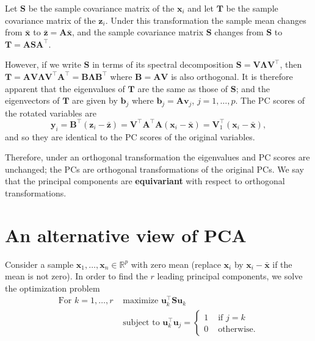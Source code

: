 \documentclass[]{book}
\theoremstyle{definition}
\theoremstyle{definition}
\theoremstyle{definition}
\theoremstyle{remark}
\begin{document}
Let \(\boldsymbol S\) be the sample covariance matrix of the \(\boldsymbol x_i\) and let \(\boldsymbol T\) be the sample covariance matrix of the \(\boldsymbol z_i\). Under this transformation the sample mean changes from \(\bar{\boldsymbol x}\) to \(\bar{\boldsymbol z} = \boldsymbol A\bar{\boldsymbol x}\), and the sample covariance matrix \(\boldsymbol S\) changes from \(\boldsymbol S\) to \(\boldsymbol T= \boldsymbol A\boldsymbol S\boldsymbol A^\top\).

However, if we write \(\boldsymbol S\) in terms of its spectral decomposition \(\boldsymbol S= \boldsymbol V\boldsymbol \Lambda\boldsymbol V^\top\), then \(\boldsymbol T= \boldsymbol A\boldsymbol V\boldsymbol \Lambda\boldsymbol V^\top \boldsymbol A^\top = \boldsymbol B\boldsymbol \Lambda\boldsymbol B^\top\) where \(\boldsymbol B= \boldsymbol A\boldsymbol V\) is also orthogonal. It is therefore apparent that the eigenvalues of \(\boldsymbol T\) are the same as those of \(\boldsymbol S\); and the eigenvectors of \(\boldsymbol T\) are given by \(\boldsymbol b_j\) where \(\boldsymbol b_j = \boldsymbol A\boldsymbol v_j\), \(j=1,\ldots,p\). The PC scores of the rotated variables are
\[ \boldsymbol y_i = \boldsymbol B^\top (\boldsymbol z_i - \bar{\boldsymbol z}) = \boldsymbol V^\top \boldsymbol A^\top \boldsymbol A(\boldsymbol x_i - \bar{\boldsymbol x}) = \boldsymbol V_1^\top (\boldsymbol x_i - \bar{\boldsymbol x}),\]
and so they are identical to the PC scores of the original variables.

Therefore, under an orthogonal transformation the eigenvalues and PC scores are unchanged; the PCs are orthogonal transformations of the original PCs. We say that the principal components are \textbf{equivariant} with respect to orthogonal transformations.

\hypertarget{an-alternative-view-of-pca}{%
\section{An alternative view of PCA}\label{an-alternative-view-of-pca}}

Consider a sample \(\boldsymbol x_1, \ldots , \boldsymbol x_n \in \mathbb{R}^p\) with zero mean (replace \(\boldsymbol x_i\) by \(\boldsymbol x_i-\bar{\boldsymbol x}\) if the mean is not zero). In order to find the \(r\) leading principal components, we solve the optimization problem
\begin{align*}
\mbox{For } k=1, \ldots, r &\mbox{ maximize } \boldsymbol u_k^\top \boldsymbol S\boldsymbol u_k \\
 &\mbox{ subject to } \boldsymbol u_k^\top \boldsymbol u_j = \begin{cases}
 1  &\mbox{ if } j=k\\
 0 & \mbox{ otherwise.}
 \end{cases}
 \end{align*}
\end{document}
